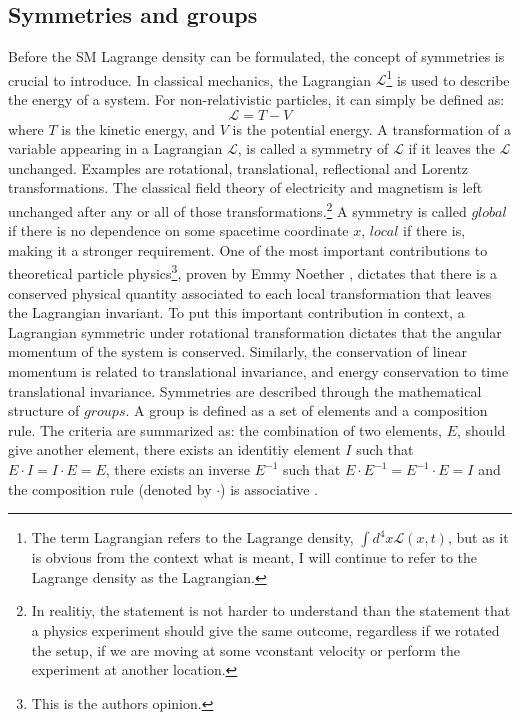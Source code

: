 \subsection*{Symmetries and groups}\label{sec:symmetries}
\noindent\justify
Before the SM Lagrange density can be formulated, the concept of symmetries is crucial to introduce. 
In classical mechanics, the Lagrangian $\mathcal{L}$\footnote{The term Lagrangian refers to the Lagrange density, $\int d^{4}x\mathcal{L}(x,t)$, but as it is obvious from the context what is meant, I will continue to refer to the Lagrange density as the Lagrangian. } is used to describe the energy of a system. 
For non-relativistic particles, it can simply be defined as:
\begin{equation}
\mathcal{L}=T-V
\end{equation}
where $T$ is the kinetic energy, and $V$ is the potential energy. 
A transformation of a variable appearing in a Lagrangian $\mathcal{L}$, is called a symmetry of $\mathcal{L}$ if it leaves the $\mathcal{L}$ unchanged. 
Examples are rotational, translational, reflectional and Lorentz transformations. 
The classical field theory of electricity and magnetism is left unchanged after any or all of those transformations.\footnote{In realitiy, the statement is not harder to understand than the statement that a physics experiment should give the same outcome, regardless if we rotated the setup, if we are moving at some vconstant velocity or perform the experiment at another location.} 
A symmetry is called $global$ if there is no dependence on some spacetime coordinate $x$, $local$ if there is, making it a stronger requirement. 
One of the most important contributions to theoretical particle physics\footnote{This is the authors opinion.}, proven by Emmy Noether \cite{Noether1918}, dictates that there is a conserved physical quantity associated to each local transformation that leaves the Lagrangian invariant.   
To put this important contribution in context, a Lagrangian symmetric under rotational transformation dictates that the angular momentum of the system is conserved.
Similarly, the conservation of linear momentum is related to translational invariance, and energy conservation to time translational invariance.  
Symmetries are described through the mathematical structure of $groups$. 
A group is defined as a set of elements and a composition rule. 
The criteria are summarized as: the combination of two elements, $E$, should give another element, there exists an identitiy element $I$ such that $E\cdot I=I\cdot E=E$, there exists an inverse $E^{-1}$ such that $E\cdot E^{-1}=E^{-1}\cdot E=I$ and the composition rule (denoted by $\cdot$) is associative \cite{Kane:2244793}.   
